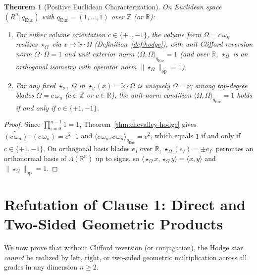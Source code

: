 \documentclass[11pt]{article}
\newtheorem{theorem}{Theorem}[section]
\theoremstyle{definition}
\begin{document}
\begin{theorem}[Positive Euclidean Characterization]\label{thm:euclidean-pos}
On Euclidean space $(R^n, q_{\mathrm{Euc}})$ with $q_{\mathrm{Euc}} = (1, \dots, 1)$ over $\mathbb{Z}$ (or $\mathbb{R}$):
\begin{enumerate}
  \item[(1)] For either volume orientation $c \in \{+1, -1\}$, the volume form $\Omega = c\,\omega_n$ realizes $\star_\Omega$ via $x \mapsto \widetilde{x}\cdot\Omega$ (Definition~\ref{def:hodge}), with unit Clifford reversion norm $\widetilde{\Omega}\cdot\Omega = 1$ and unit exterior norm $\langle \Omega, \Omega \rangle_{q_{\mathrm{Euc}}} = 1$ (and over $\mathbb{R}$, $\star_\Omega$ is an orthogonal isometry with operator norm $\|\star_\Omega\|_{\mathrm{op}} = 1$).
  \item[(2)] For any fixed $\star_\nu$, $\Omega$ in $\star_\nu(x) = \widetilde{x}\cdot\Omega$ is uniquely $\Omega = \nu$; among top-degree blades $\Omega = c\,\omega_n$ ($c \in \mathbb{Z}$ or $c \in \mathbb{R}$), the unit-norm condition $\langle \Omega, \Omega \rangle_{q_{\mathrm{Euc}}} = 1$ holds if and only if $c \in \{+1, -1\}$.
\end{enumerate}
\end{theorem}
\begin{proof}
Since $\prod_{i=0}^{n-1} 1 = 1$, Theorem~\ref{thm:chevalley-hodge} gives $\widetilde{(c\,\omega_n)}\cdot(c\,\omega_n) = c^2\cdot 1$ and $\langle c\,\omega_n, c\,\omega_n\rangle_{q_{\mathrm{Euc}}} = c^2$, which equals $1$ if and only if $c \in \{+1, -1\}$. On orthogonal basis blades $e_I$ over $\mathbb{R}$, $\star_\Omega(e_I) = \pm e_{I^c}$ permutes an orthonormal basis of $\Lambda(\mathbb{R}^n)$ up to signs, so $\langle\star_\Omega x, \star_\Omega y\rangle = \langle x, y\rangle$ and $\|\star_\Omega\|_{\mathrm{op}} = 1$.
\end{proof}

\section{Refutation of Clause 1: Direct and Two-Sided Geometric Products}

We now prove that without Clifford reversion (or conjugation), the Hodge star \emph{cannot} be realized by left, right, or two-sided geometric multiplication across all grades in any dimension $n \ge 2$.
\end{document}
